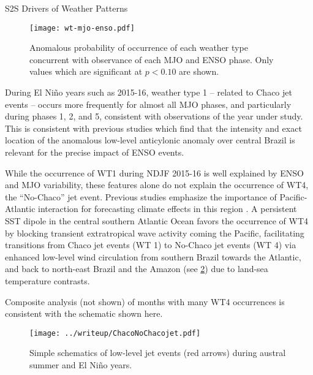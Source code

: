 \begin{block}{S2S Drivers of Weather Patterns}
  \begin{mdframed}
  \begin{figure}
    \caption{
  		Anomalous probability of occurrence of each weather type concurrent with observance of each MJO and ENSO phase.
  		Only values which are significant at $p<0.10$ are shown.
      \label{fig:wt-mjo-enso}
  	}
  	\noindent\texttt{[image: wt-mjo-enso.pdf]}
  \end{figure}
  \end{mdframed}

  During El Ni\~{n}o years such as 2015-16, weather type 1 -- related to Chaco jet events -- occurs more frequently for almost all MJO phases, and particularly during phases 1, 2, and 5, consistent with observations of the year under study.
  This is consistent with previous studies \cite[i.e.][]{Velasco1987} which find that the intensity and exact location of the anomalous low-level anticylonic anomaly over central Brazil is relevant for the precise impact of ENSO events.

  \vspace{0.5cm}

  While the occurrence of WT1 during NDJF 2015-16 is well explained by ENSO and MJO variability, these features alone do not explain the occurrence of WT4, the ``No-Chaco'' jet event.
  Previous studies emphasize the importance of Pacific-Atlantic interaction for forecasting climate effects in this region \cite{Vera:2006ib,Barreiro:2017ct,Lima:2017hw}.
  A persistent SST dipole in the central southern Atlantic Ocean favors the occurrence of WT4 by blocking transient extratropical wave activity coming the Pacific, facilitating transitions from Chaco jet events (WT 1) to No-Chaco jet events (WT 4) via enhanced low-level wind circulation from southern Brazil towards the Atlantic, and back to north-east Brazil and the Amazon (see \cref{fig:chaco-nochaco}) due to land-sea temperature contrasts.

  \vspace{0.5cm}

  Composite analysis (not shown) of months with many WT4 occurrences is consistent with the schematic shown here.

  \begin{mdframed}
  \begin{figure}
  	\noindent\texttt{[image: ../writeup/ChacoNoChacojet.pdf]}
    \caption{
      Simple schematics of low-level jet events (red arrows) during austral summer and El Ni\~no years.
      \label{fig:chaco-nochaco}
  	}

  \end{figure}
  \end{mdframed}
\end{block}
